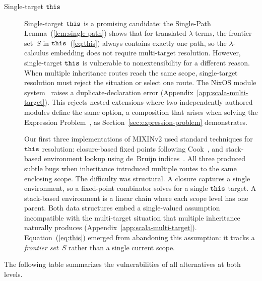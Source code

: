 \begin{description}
  \item[Single-target $\mathtt{this}$]
    Single-target $\mathtt{this}$ is a promising candidate:
    the Single-Path Lemma~(\ref{lem:single-path}) shows that
    for translated $\lambda$-terms, the frontier set~$S$ in
    $\mathtt{this}$~(\ref{eq:this}) always contains exactly one path,
    so the $\lambda$-calculus embedding does not require
    multi-target resolution.
    However, single-target $\mathtt{this}$ is vulnerable to
    nonextensibility for a different reason.
    When multiple inheritance routes reach the same scope,
    single-target resolution must reject the situation or select
    one route.
    The NixOS module system~\cite{nixosmodules} raises a
    duplicate-declaration error
    (Appendix~\ref{app:scala-multi-target}).
    This rejects nested extensions where two independently authored
    modules define the same option, a composition that arises
    when solving the Expression
    Problem~\cite{wadler1998-expression-problem},
    as Section~\ref{sec:expression-problem} demonstrates.

    Our first three implementations of MIXINv2 used
    standard techniques for $\mathtt{this}$ resolution: closure-based
    fixed points following Cook~\cite{cook1989-denotational-inheritance}, and
    stack-based environment lookup using de~Bruijn
    indices~\cite{debruijn1972-nameless-dummies}.
    All three produced subtle bugs when inheritance introduced
    multiple routes to the same enclosing scope.
    The difficulty was structural.
    A closure captures a single environment, so a fixed-point
    combinator solves for a single $\mathtt{this}$ target.
    A stack-based environment is a linear chain where each scope
    level has one parent.
    Both data structures embed a single-valued assumption
    incompatible with the multi-target situation that multiple
    inheritance naturally produces
    (Appendix~\ref{app:scala-multi-target}).
    Equation~(\ref{eq:this}) emerged from abandoning this
    assumption: it tracks a \emph{frontier set}~$S$ rather than a
    single current scope.
\end{description}

\noindent
The following table summarizes the vulnerabilities of all
alternatives at both levels.

